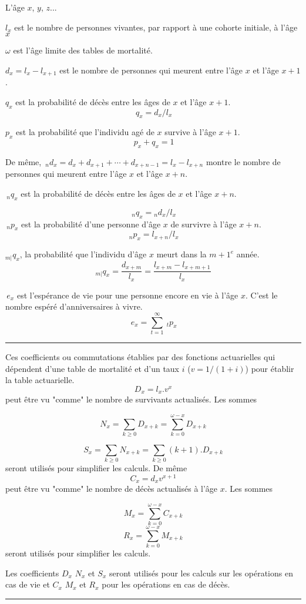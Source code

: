 
\begin{f}

L'âge \(x\), \(y\), \(z\)...    

\(l_x\) est le nombre de personnes vivantes, par rapport à une cohorte initiale, à l'âge \(x\)

\(\omega\) est l'âge limite des tables de mortalité.

\(d_x=l_x-l_{x+1}\) est le nombre de personnes qui meurent entre l'âge \(x\) et l'âge \(x+1\).

\(q_x\) est la probabilité de décès entre les âges de \(x\) et l'âge \(x+1\).
\[
\,q_x = d_x / l_x 
\]

\(p_x\) est la probabilité que l'individu agé de \(x\) survive à l'âge \(x+1\).
\[
\,p_x+q_x=1 
\]

De même, 
\(\,_nd_x = d_x + d_{x+1} + \cdots + d_{x+n-1} = l_x - l_{x+n}\) montre le nombre de personnes qui meurent entre l'âge \(x\) et l'âge \(x+n\).

\(\,_nq_x\) est la probabilité de décès entre les âges de \(x\) et l'âge \(x+n\).

\[
\,_nq_x = {}_nd_x / l_x
\]
\(\,_np_x\) est la probabilité d'une personne d'âge \(x\) de survivre à l'âge \(x+n\).
\[
\,_np_x = l_{x+n} / l_x 
\]


\({}_{m|}q_{x}\), la probabilité que l'individu d'âge \(x\) meurt dans la \({m+1}^e\) année.
\[{}_{m|}q_{x}=\frac{d_{x+m}}{l_x}=\frac{l_{x+m}-l_{x+m+1}}{l_x}\]

\(\,e_x\)  est l'espérance de vie pour une personne encore en vie à l'âge \(x\). 
C'est le nombre espéré d'anniversaires à vivre.
\[
\,e_x = \sum_{t=1}^{\infty} \ _tp_x 
\]
\end{f}
\hrule

\begin{f}


Ces coefficients ou commutations établies par des fonctions actuarielles qui dépendent d'une table de mortalité et d'un taux \(i\) (\(v=1/(1+i)\)) pour établir la table actuarielle. 
\[
D_x=l_x .v^x
\]
peut être vu "comme" le nombre de survivants actualisés. Les sommes 

\[
N_x=\sum_{k\geq 0} D_{x+k}=\sum_{k= 0}^{\omega-x} D_{x+k}
\]

\[
S_x=\sum_{k\geq 0} N_{x+k}=\sum_{k\geq 0}(k+1). D_{x+k}
\]
seront utilisés pour simplifier les calculs.
De même
\[
C_x = d_x v^{ x+1} 
\]
peut être vu "comme" le nombre de décès  actualisés à l'âge \(x\). Les sommes

\[
M_x=\sum_{k= 0}^{\omega-x} C_{x+k}
\]
\[
R_x=\sum_{k= 0}^{\omega-x} M_{x+k}
\]
seront utilisés pour simplifier les calculs.

Les  coefficients \(D_x\) \(N_x\) et \(S_x\) seront utilisés pour les calculs sur les opérations en cas de vie et \(C_x\) \(M_x\) et \(R_x\)  pour les opérations en cas de décès.

\end{f} 
\hrule

